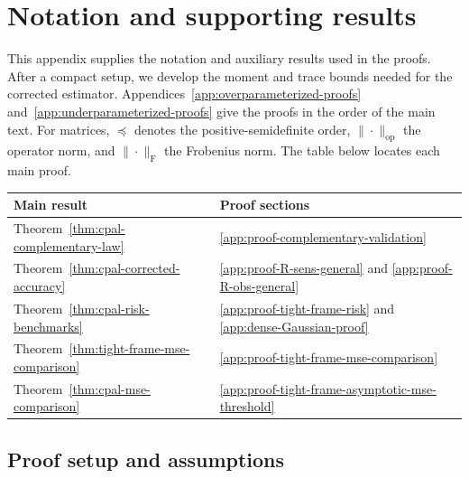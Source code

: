 \documentclass{article}
\theoremstyle{plain} %
\theoremstyle{definition} %
\theoremstyle{definition} %
\begin{document}
\FloatBarrier

\clearpage
\section{Notation and supporting results}
\label{app:extended-results}

This appendix supplies the notation and auxiliary results used in the
proofs. After a compact setup, we develop the moment and trace bounds
needed for the corrected estimator. Appendices~\ref{app:overparameterized-proofs}
and~\ref{app:underparameterized-proofs} give the proofs in the order of
the main text.
For matrices, $\preceq$ denotes the positive-semidefinite order,
$\|\cdot\|_{\mathrm{op}}$ the operator norm, and
$\|\cdot\|_{\mathrm F}$ the Frobenius norm.
The table below locates each main proof.
\begin{center}
\begin{tabular}{@{}ll@{}}
\toprule
Main result & Proof sections \\
\midrule
Theorem~\ref{thm:cpal-complementary-law} & \ref{app:proof-complementary-validation} \\
Theorem~\ref{thm:cpal-corrected-accuracy} & \ref{app:proof-R-sens-general} and \ref{app:proof-R-obs-general} \\
Theorem~\ref{thm:cpal-risk-benchmarks} & \ref{app:proof-tight-frame-risk} and \ref{app:dense-Gaussian-proof} \\
Theorem~\ref{thm:tight-frame-mse-comparison} & \ref{app:proof-tight-frame-mse-comparison} \\
Theorem~\ref{thm:cpal-mse-comparison} & \ref{app:proof-tight-frame-asymptotic-mse-threshold} \\
\bottomrule
\end{tabular}
\end{center}

\subsection{Proof setup and assumptions}
\label{app:proof-setup}
\end{document}
